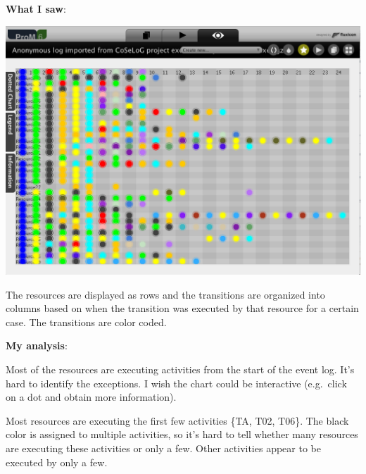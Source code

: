 \documentclass[]{article}
\begin{document}
\textbf{What I saw}:

\includegraphics{CoSeLoG_Step_07_Filtered_SocialDots.png}

The resources are displayed as rows and the transitions are organized
into columns based on when the transition was executed by that resource
for a certain case. The transitions are color coded.

\textbf{My analysis}:

Most of the resources are executing activities from the start of the
event log. It's hard to identify the exceptions. I wish the chart could
be interactive (e.g.~click on a dot and obtain more information).

Most resources are executing the first few activities \{TA, T02, T06\}.
The black color is assigned to multiple activities, so it's hard to tell
whether many resources are executing these activities or only a few.
Other activities appear to be executed by only a few.
\end{document}
